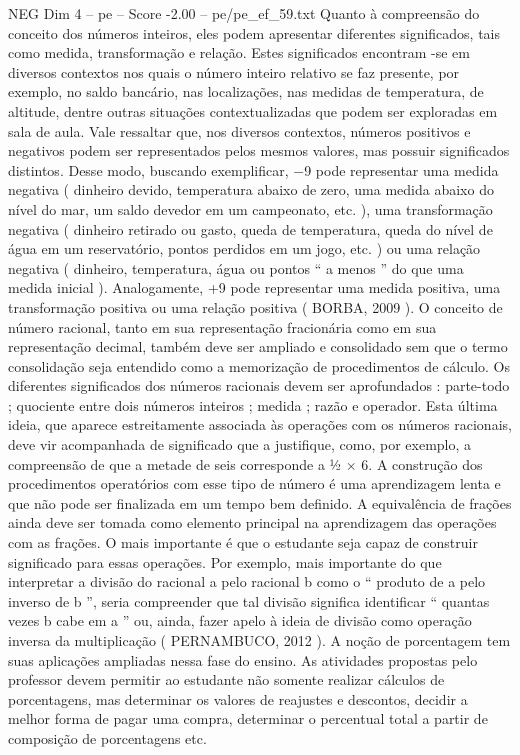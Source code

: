 \begin{textsample}{NEG Dim 4 – pe – Score -2.00 – pe/pe\_ef\_59.txt}
Quanto à compreensão do conceito dos números inteiros, eles podem apresentar diferentes significados, tais como medida, transformação e relação.
Estes significados encontram -se em diversos contextos nos quais o número inteiro relativo se faz presente, por exemplo, no saldo bancário, nas localizações, nas medidas de temperatura, de altitude, dentre outras situações contextualizadas que podem ser exploradas em sala de aula.
Vale ressaltar que, nos diversos contextos, números positivos e negativos podem ser representados pelos mesmos valores, mas possuir significados distintos.
Desse modo, buscando exemplificar, −9 pode representar uma medida negativa ( dinheiro devido, temperatura abaixo de zero, uma medida abaixo do nível do mar, um saldo devedor em um campeonato, etc. ), uma transformação negativa ( dinheiro retirado ou gasto, queda de temperatura, queda do nível de água em um reservatório, pontos perdidos em um jogo, etc. ) ou uma relação negativa ( dinheiro, temperatura, água ou pontos “ a menos ” do que uma medida inicial ).
Analogamente, +9 pode representar uma medida positiva, uma transformação positiva ou uma relação positiva ( BORBA, 2009 ).
O conceito de número racional, tanto em sua representação fracionária como em sua representação decimal, também deve ser ampliado e consolidado sem que o termo consolidação seja entendido como a memorização de procedimentos de cálculo.
Os diferentes significados dos números racionais devem ser aprofundados : parte-todo ; quociente entre dois números inteiros ; medida ; razão e operador.
Esta última ideia, que aparece estreitamente associada às operações com os números racionais, deve vir acompanhada de significado que a justifique, como, por exemplo, a compreensão de que a metade de seis corresponde a ½ × 6.
A construção dos procedimentos operatórios com esse tipo de número é uma aprendizagem lenta e que não pode ser finalizada em um tempo bem definido.
A equivalência de frações ainda deve ser tomada como elemento principal na aprendizagem das operações com as frações.
O mais importante é que o estudante seja capaz de construir significado para essas operações.
Por exemplo, mais importante do que interpretar a divisão do racional a pelo racional b como o “ produto de a pelo inverso de b ”, seria compreender que tal divisão significa identificar “ quantas vezes b cabe em a ” ou, ainda, fazer apelo à ideia de divisão como operação inversa da multiplicação ( PERNAMBUCO, 2012 ).
A noção de porcentagem tem suas aplicações ampliadas nessa fase do ensino.
As atividades propostas pelo professor devem permitir ao estudante não somente realizar cálculos de porcentagens, mas determinar os valores de reajustes e descontos, decidir a melhor forma de pagar uma compra, determinar o percentual total a partir de composição de porcentagens etc.

\end{textsample}
